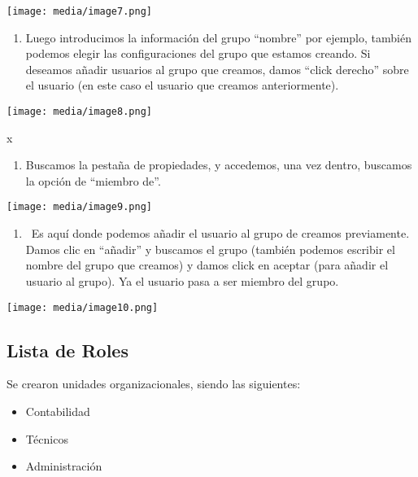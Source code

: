 \documentclass[
]{article}
\begin{document}
\texttt{[image: media/image7.png]}

\begin{enumerate}
\def\labelenumi{\arabic{enumi}.}
\setcounter{enumi}{6}
\item
  Luego introducimos la información del grupo ``nombre'' por ejemplo,
  también podemos elegir las configuraciones del grupo que estamos
  creando. Si deseamos añadir usuarios al grupo que creamos, damos
  ``click derecho'' sobre el usuario (en este caso el usuario que
  creamos anteriormente).
\end{enumerate}

\texttt{[image: media/image8.png]}

x

\begin{enumerate}
\def\labelenumi{\arabic{enumi}.}
\setcounter{enumi}{7}
\item
  Buscamos la pestaña de propiedades, y accedemos, una vez dentro,
  buscamos la opción de ``miembro de''.~
\end{enumerate}

\texttt{[image: media/image9.png]}

\begin{enumerate}
\def\labelenumi{\arabic{enumi}.}
\setcounter{enumi}{8}
\item
  ~Es aquí donde podemos añadir el usuario al grupo de creamos
  previamente. Damos clic en ``añadir'' y buscamos el grupo (también
  podemos escribir el nombre del grupo que creamos) y damos click en
  aceptar (para añadir el usuario al grupo). Ya el usuario pasa a ser
  miembro del grupo.
\end{enumerate}

\texttt{[image: media/image10.png]}

\hypertarget{lista-de-roles}{%
\subsection{Lista de Roles}\label{lista-de-roles}}

Se crearon unidades organizacionales, siendo las siguientes:

\begin{itemize}
\item
  Contabilidad
\item
  Técnicos
\item
  Administración
\end{itemize}
\end{document}
